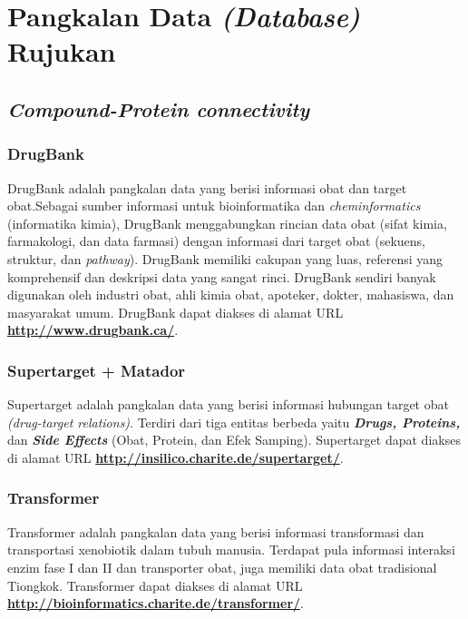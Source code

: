 \chapter{Pangkalan Data \emph{(Database)} Rujukan} \label{db chapter}

\section{\emph{Compound-Protein connectivity}}
	\subsection{DrugBank} \label{drugbank}
	DrugBank adalah pangkalan data yang berisi informasi obat dan target obat.Sebagai sumber informasi untuk bioinformatika dan \emph{cheminformatics} (informatika kimia), DrugBank menggabungkan rincian data obat (sifat kimia, farmakologi, dan data farmasi) dengan informasi dari target obat (sekuens, struktur, dan \emph{pathway}). DrugBank memiliki cakupan yang luas, referensi yang komprehensif dan deskripsi data yang sangat rinci. DrugBank sendiri banyak digunakan oleh industri obat, ahli kimia obat, apoteker, dokter, mahasiswa, dan masyarakat umum. DrugBank dapat diakses di alamat URL \href{http://www.drugbank.ca/}{\textbf{http://www.drugbank.ca/}}.

	\subsection{Supertarget + Matador} \label{supertarget}
	Supertarget adalah pangkalan data yang berisi informasi hubungan target obat \emph{(drug-target relations)}. Terdiri dari tiga entitas berbeda yaitu \textbf{\emph{Drugs, Proteins,}} dan \textbf{\emph{Side Effects}} (Obat, Protein, dan Efek Samping). Supertarget dapat diakses di alamat URL \href{http://insilico.charite.de/supertarget/}{\textbf{http://insilico.charite.de/supertarget/}}.

	\subsection{Transformer} \label{transformer}
	Transformer adalah pangkalan data yang berisi informasi transformasi dan transportasi xenobiotik dalam tubuh manusia. Terdapat pula informasi interaksi enzim fase I dan II dan transporter obat, juga memiliki data obat tradisional Tiongkok. Transformer dapat diakses di alamat URL \href{http://bioinformatics.charite.de/transformer/}{\textbf{http://bioinformatics.charite.de/transformer/}}.

